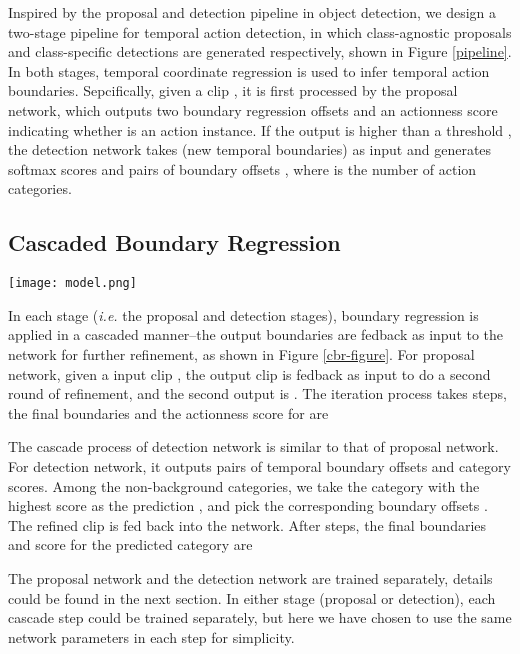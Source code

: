 \documentclass{bmvc2k}
\begin{document}
Inspired by the proposal and detection pipeline in object detection, we design a two-stage pipeline for temporal action detection, in which class-agnostic proposals  and class-specific detections are generated respectively, shown in Figure \ref{pipeline}. In both stages, temporal coordinate regression is used to infer temporal action boundaries. Sepcifically, given a clip , it is first processed by the proposal network, which outputs two boundary regression offsets  and an actionness score  indicating whether  is an action instance. If the output  is higher than a threshold , the detection network takes  (new temporal boundaries) as input and generates  softmax scores   and  pairs of boundary offsets , where  is the number of action categories. 

\subsection{Cascaded Boundary Regression}
\begin{figure*}[h]
\centering
\texttt{[image: model.png]}
\caption{ Unrolled model of Cascaded Boundary Regression (CBR), the parameters of the MLPs are shared.}
\label{cbr-figure}
\end{figure*}

In each stage (\emph{i.e.} the proposal and detection stages), boundary regression is applied in a cascaded manner--the output boundaries are fedback as input to the network for further refinement, as shown in Figure \ref{cbr-figure}. For proposal network, given a input clip , the output clip  is fedback as input to do a second round of refinement, and the second output is . The iteration process takes  steps, the final boundaries and the actionness score for  are 


The cascade process of detection network is similar to that of proposal network. For detection network, it outputs  pairs of temporal boundary offsets and  category scores. Among the  non-background categories, we take the category with the highest score as the prediction , and pick the corresponding boundary offsets . The refined clip  is fed back into the network. After  steps, the final boundaries and score for the predicted category  are

The proposal network and the detection network are trained separately, details could be found in the next section. In either stage (proposal or detection), each cascade step could be trained separately, but here we have chosen to use the same network parameters in each step for simplicity.
\end{document}
